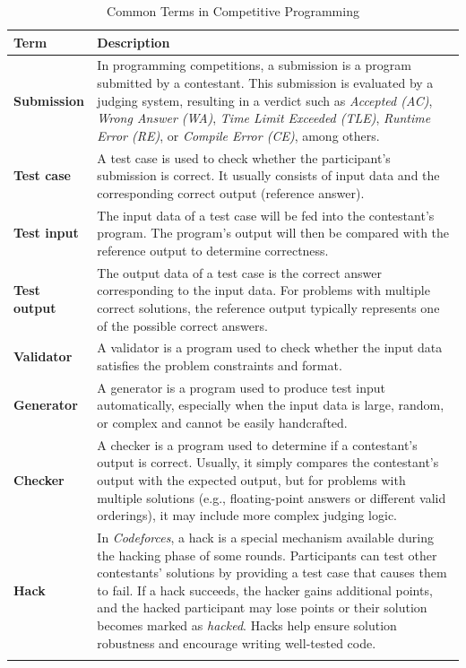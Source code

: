 \documentclass[11pt]{article}
\begin{document}
\begin{table}[htbp]
\normalsize
\centering
\caption{Common Terms in Competitive Programming}
\renewcommand{\arraystretch}{1.2}
\begin{tabularx}{\textwidth}{@{}>{\raggedright\arraybackslash}p{4.5cm} >{\raggedright\arraybackslash}X@{}}
\toprule
\textbf{Term} & \textbf{Description} \\ \midrule

\textbf{Submission} &
In programming competitions, a submission is a program submitted by a contestant.
This submission is evaluated by a judging system, resulting in a verdict such as
\textit{Accepted (AC)}, \textit{Wrong Answer (WA)}, \textit{Time Limit Exceeded (TLE)},
\textit{Runtime Error (RE)}, or \textit{Compile Error (CE)}, among others. \\[0.4em]

\textbf{Test case} &
A test case is used to check whether the participant’s submission is correct.
It usually consists of input data and the corresponding correct output (reference answer). \\[0.4em]

\textbf{Test input} &
The input data of a test case will be fed into the contestant’s program.
The program’s output will then be compared with the reference output to determine correctness. \\[0.4em]

\textbf{Test output}&
The output data of a test case is the correct answer corresponding to the input data.
For problems with multiple correct solutions, the reference output typically represents
one of the possible correct answers. \\[0.4em]

\textbf{Validator} &
A validator is a program used to check whether the input data satisfies the problem
constraints and format. \\[0.4em]

\textbf{Generator}&
A generator is a program used to produce test input automatically, especially when
the input data is large, random, or complex and cannot be easily handcrafted. \\[0.4em]

\textbf{Checker}&
A checker is a program used to determine if a contestant’s output is correct.
Usually, it simply compares the contestant’s output with the expected output, but for
problems with multiple solutions (e.g., floating-point answers or different valid orderings),
it may include more complex judging logic. \\[0.4em]

\textbf{Hack} &
In \textit{Codeforces}, a hack is a special mechanism available during the hacking phase
of some rounds. Participants can test other contestants’ solutions by providing a test case
that causes them to fail. If a hack succeeds, the hacker gains additional points, and the
hacked participant may lose points or their solution becomes marked as \textit{hacked}.
Hacks help ensure solution robustness and encourage writing well-tested code. \\

\bottomrule
\label{tab:terms}
\end{tabularx}
\end{table}
\end{document}
